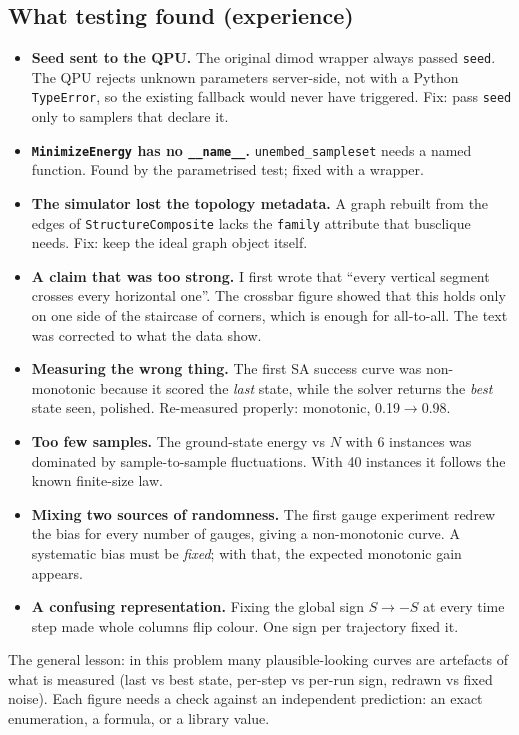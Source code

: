 \documentclass[11pt,a4paper]{article}
\newcommand{\code}[1]{\nolinkurl{#1}}
\begin{document}
\subsection{What testing found (experience)}
\begin{itemize}
\item \textbf{Seed sent to the QPU.} The original dimod wrapper always passed \code{seed}. The QPU rejects unknown parameters server-side, not with a Python \code{TypeError}, so the existing fallback would never have triggered. Fix: pass \code{seed} only to samplers that declare it.
\item \textbf{\code{MinimizeEnergy} has no \code{__name__}.} \code{unembed_sampleset} needs a named function. Found by the parametrised test; fixed with a wrapper.
\item \textbf{The simulator lost the topology metadata.} A graph rebuilt from the edges of \code{StructureComposite} lacks the \code{family} attribute that busclique needs. Fix: keep the ideal graph object itself.
\item \textbf{A claim that was too strong.} I first wrote that ``every vertical segment crosses every horizontal one''. The crossbar figure showed that this holds only on one side of the staircase of corners, which is enough for all-to-all. The text was corrected to what the data show.
\item \textbf{Measuring the wrong thing.} The first SA success curve was non-monotonic because it scored the \emph{last} state, while the solver returns the \emph{best} state seen, polished. Re-measured properly: monotonic, 0.19$\to$0.98.
\item \textbf{Too few samples.} The ground-state energy vs $N$ with 6 instances was dominated by sample-to-sample fluctuations. With 40 instances it follows the known finite-size law.
\item \textbf{Mixing two sources of randomness.} The first gauge experiment redrew the bias for every number of gauges, giving a non-monotonic curve. A systematic bias must be \emph{fixed}; with that, the expected monotonic gain appears.
\item \textbf{A confusing representation.} Fixing the global sign $S\to-S$ at every time step made whole columns flip colour. One sign per trajectory fixed it.
\end{itemize}
The general lesson: in this problem many plausible-looking curves are artefacts of what is measured (last vs best state, per-step vs per-run sign, redrawn vs fixed noise). Each figure needs a check against an independent prediction: an exact enumeration, a formula, or a library value.
\end{document}
